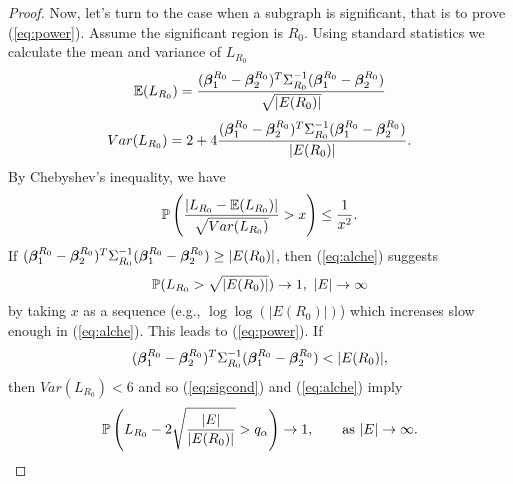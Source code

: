 \begin{proof}
Now, let's turn to the case when a subgraph is significant, that is to prove (\ref{eq:power}). Assume the significant region is $R_0$. Using standard statistics we calculate the mean and variance of $L_{R_0}$
$$
\mathbb{E}(L_{R_0})=\frac{(\bm{\beta}_1^{R_0}-\bm{\beta}_2^{R_0})^T\Sigma_{R_0}^{-1}(\bm{\beta}_1^{R_0}-\bm{\beta}_2^{R_0})}{ \sqrt{|E({R_0})|}}
$$
$$ Var(L_{R_0})=2+4\frac{(\bm{\beta}_1^{R_0}-\bm{\beta}_2^{R_0})^T\Sigma_{R_0}^{-1}(\bm{\beta}_1^{R_0}-\bm{\beta}_2^{R_0})}{ |E({R_0})|}.
$$
By Chebyshev's inequality, we have
\begin{equation}
\label{eq:alche}
\mathbb{P}\left(\frac{|L_{R_0}-\mathbb{E}(L_{R_0})|}{ \sqrt{Var(L_{R_0})}}>x\right)\le \frac{1}{x^2}.
\end{equation}
If $(\bm{\beta}_1^{R_0}-\bm{\beta}_2^{R_0})^T\Sigma_{R_0}^{-1}(\bm{\beta}_1^{R_0}-\bm{\beta}_2^{R_0})\ge |E({R_0})|$, then (\ref{eq:alche}) suggests 
$$
\mathbb{P}(L_{R_0}>\sqrt{|E(R_0)|})\to 1,\  |E|\to \infty
$$ by taking $x$ as a sequence (e.g., $\log\log(|E(R_0)|)$) which increases slow enough in (\ref{eq:alche}). This leads to (\ref{eq:power}).
If 
$$
(\Bbeta_1^{R_0}-\Bbeta_2^{R_0})^T\Sigma_{R_0}^{-1}(\Bbeta_1^{R_0}-\Bbeta_2^{R_0})<|E({R_0})|,
$$
then $Var(L_{R_0})<6$ and so (\ref{eq:sigcond}) and (\ref{eq:alche}) imply
$$
\mathbb{P}\left(L_{R_0}-2\sqrt{\frac{|E|}{ |E(R_0)|}}>q_\alpha\right)\to 1, \qquad{\rm as}\  |E|\to \infty.
$$
\end{proof}



